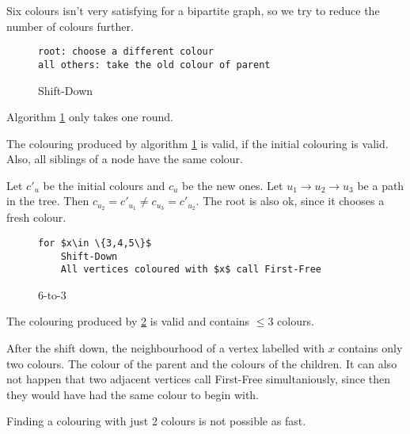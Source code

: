 Six colours isn't very satisfying for a bipartite graph, so we try to reduce the number of colours further.

\begin{figure}[hbt]
\begin{lstlisting}
root: choose a different colour
all others: take the old colour of parent
\end{lstlisting}
\caption{Shift-Down}
\label{alg:Shift-Down}
\end{figure}

Algorithm \ref{alg:Shift-Down} only takes one round.

\begin{lem} The colouring produced by algorithm \ref{alg:Shift-Down} is valid, if the initial colouring is valid. Also, all siblings of a node have the same colour.\end{lem}

\begin{pr} Let $c'_u$ be the initial colours and $c_u$ be the new ones. Let $u_1\rightarrow u_2 \rightarrow u_3$ be a path in the tree. Then $c_{u_2}=c'_{u_1} \neq c_{u_3}=c'_{u_2}$. The root is also ok, since it chooses a fresh colour.\end{pr}

\begin{figure}[hbt]
\begin{lstlisting}
for $x\in \{3,4,5\}$
	Shift-Down
	All vertices coloured with $x$ call First-Free
\end{lstlisting}
\caption{6-to-3}
\label{alg:6-to-3}
\end{figure}

\begin{lem} The colouring produced by \ref{alg:6-to-3} is valid and contains $\leq 3$ colours.\end{lem}

\begin{pr} After the shift down, the neighbourhood of a vertex labelled with $x$ contains only two colours. The colour of the parent and the colours of the children. It can also not happen that two adjacent vertices call First-Free simultaniously, since then they would have had the same colour to begin with.\end{pr}

Finding a colouring with just 2 colours is not possible as fast.